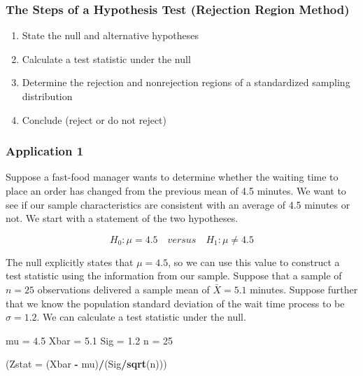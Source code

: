 \documentclass[
]{book}
\newenvironment{Shaded}{\begin{snugshade}}{\end{snugshade}}
\newcommand{\AttributeTok}[1]{\textcolor[rgb]{0.13,0.29,0.53}{#1}}
\newcommand{\DecValTok}[1]{\textcolor[rgb]{0.00,0.00,0.81}{#1}}
\newcommand{\FloatTok}[1]{\textcolor[rgb]{0.00,0.00,0.81}{#1}}
\newcommand{\FunctionTok}[1]{\textcolor[rgb]{0.13,0.29,0.53}{\textbf{#1}}}
\newcommand{\NormalTok}[1]{#1}
\newcommand{\OtherTok}[1]{\textcolor[rgb]{0.56,0.35,0.01}{#1}}
\newcommand{\SpecialCharTok}[1]{\textcolor[rgb]{0.81,0.36,0.00}{\textbf{#1}}}
\begin{document}
\subsubsection*{The Steps of a Hypothesis Test (Rejection Region Method)}\label{the-steps-of-a-hypothesis-test-rejection-region-method}

\begin{enumerate}
\def\labelenumi{\arabic{enumi}.}
\item
  State the null and alternative hypotheses
\item
  Calculate a test statistic under the null
\item
  Determine the rejection and nonrejection regions of a standardized sampling distribution
\item
  Conclude (reject or do not reject)
\end{enumerate}

\subsubsection*{Application 1}\label{application-1-1}

Suppose a fast-food manager wants to determine whether the waiting time to place an order has changed from the previous mean of 4.5 minutes. We want to see if our sample characteristics are consistent with an average of 4.5 minutes or not. We start with a statement of the two hypotheses.

\[H_0:\mu=4.5 \quad versus \quad H_1:\mu\neq 4.5\]

The null explicitly states that \(\mu=4.5\), so we can use this value to construct a test statistic using the information from our sample. Suppose that a sample of \(n=25\) observations delivered a sample mean of \(\bar{X}=5.1\) minutes. Suppose further that we know the population standard deviation of the wait time process to be \(\sigma=1.2\). We can calculate a test statistic under the null.

\begin{Shaded}
\begin{Highlighting}[]
\NormalTok{mu }\OtherTok{=} \FloatTok{4.5}
\NormalTok{Xbar }\OtherTok{=} \FloatTok{5.1}
\NormalTok{Sig }\OtherTok{=} \FloatTok{1.2}
\NormalTok{n }\OtherTok{=} \DecValTok{25}

\NormalTok{(}\AttributeTok{Zstat =}\NormalTok{ (Xbar }\SpecialCharTok{{-}}\NormalTok{ mu)}\SpecialCharTok{/}\NormalTok{(Sig}\SpecialCharTok{/}\FunctionTok{sqrt}\NormalTok{(n)))}
\end{Highlighting}
\end{Shaded}
\end{document}
